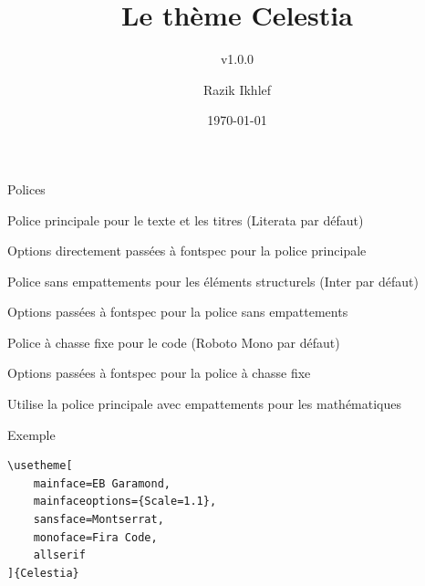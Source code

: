 \documentclass[%
    10pt,
    french,
    aspectratio=1610,
    xcolor=svgnames
]{beamer}
\title{Le thème Celestia}
\subtitle{v1.0.0}
\author{Razik Ikhlef}
\date{\today}
\begin{document}
\begin{frame}[plain]
    \titlepage
\end{frame}

\begin{frame}[fragile]{Polices}
    \begin{description}[mainfaceoptions]
        \item[mainface] Police principale pour le texte et les titres (\alert{Literata} par défaut)
        \item[mainfaceoptions] Options directement passées à \alert{fontspec} pour la police principale
        \item[sansface] Police sans empattements pour les éléments structurels (\alert{Inter} par défaut)
        \item[sansfaceoptions] Options passées à \alert{fontspec} pour la police sans empattements
        \item[monoface] Police à chasse fixe pour le code (\alert{Roboto Mono} par défaut)
        \item[monofaceoptions] Options passées à \alert{fontspec} pour la police à chasse fixe
        \item[allserif] Utilise la police principale avec empattements pour les mathématiques
    \end{description}

    \begin{exampleblock}{Exemple}
        \begin{lstlisting}[style=latex]
\usetheme[
    mainface=EB Garamond,
    mainfaceoptions={Scale=1.1},
    sansface=Montserrat,
    monoface=Fira Code,
    allserif
]{Celestia}
        \end{lstlisting}
    \end{exampleblock}
\end{frame}
\end{document}
